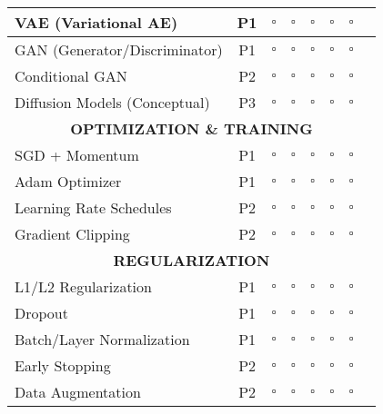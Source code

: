 \documentclass[10pt]{article}
\begin{document}
\begin{center}
\begin{longtable}{|p{3.5cm}|c|c|c|c|c|c|p{3cm}|}
VAE (Variational AE) & P1 & $\square$ & $\square$ & $\square$ & $\square$ & $\square$ & \\
\hline

GAN (Generator/Discriminator) & P1 & $\square$ & $\square$ & $\square$ & $\square$ & $\square$ & \\
\hline

Conditional GAN & P2 & $\square$ & $\square$ & $\square$ & $\square$ & $\square$ & \\
\hline

Diffusion Models (Conceptual) & P3 & $\square$ & $\square$ & $\square$ & $\square$ & $\square$ & \\
\hline

\multicolumn{8}{|c|}{\cellcolor{gray!30}\textbf{OPTIMIZATION \& TRAINING}} \\
\hline

SGD + Momentum & P1 & $\square$ & $\square$ & $\square$ & $\square$ & $\square$ & \\
\hline

Adam Optimizer & P1 & $\square$ & $\square$ & $\square$ & $\square$ & $\square$ & \\
\hline

Learning Rate Schedules & P2 & $\square$ & $\square$ & $\square$ & $\square$ & $\square$ & \\
\hline

Gradient Clipping & P2 & $\square$ & $\square$ & $\square$ & $\square$ & $\square$ & \\
\hline

\multicolumn{8}{|c|}{\cellcolor{gray!30}\textbf{REGULARIZATION}} \\
\hline

L1/L2 Regularization & P1 & $\square$ & $\square$ & $\square$ & $\square$ & $\square$ & \\
\hline

Dropout & P1 & $\square$ & $\square$ & $\square$ & $\square$ & $\square$ & \\
\hline

Batch/Layer Normalization & P1 & $\square$ & $\square$ & $\square$ & $\square$ & $\square$ & \\
\hline

Early Stopping & P2 & $\square$ & $\square$ & $\square$ & $\square$ & $\square$ & \\
\hline

Data Augmentation & P2 & $\square$ & $\square$ & $\square$ & $\square$ & $\square$ & \\
\hline


\end{longtable}
\end{center}
\end{document}
